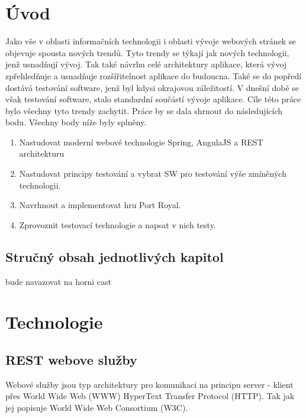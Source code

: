 \documentclass[czech,master,public,dept460,male,cpdeclaration,twoside]{diploma}
\begin{document}
\MakeTitlePages

\lstlistoflistings

\section{Úvod}
Jako vše v oblasti informačních technologii i oblasti vývoje webových stránek se objevuje spousta nových trendů. Tyto trendy se týkají jak nových technologii, jenž usnadňují vývoj. Tak také návrhu celé architektury aplikace, která vývoj zpřehledňuje a usnadňuje rozšířitelnost aplikace do budoucna. Také se do popředí dostává testování software, jenž byl kdysi okrajovou záležitostí. V dnešní době se však testování software, stalo standardní součástí vývoje aplikace. Cíle této práce bylo všechny tyto trendy zachytit. Práce by se dala shrnout do následujících bodu. Všechny body níže byly splněny.

\begin{enumerate}
	\item Nastudovat moderní webové technologie Spring, AngulaJS a REST architekturu
	\item Nastudovat principy testování a vybrat SW pro testování výše zmíněných technologii.
	\item Navrhnout a implementovat hru Port Royal.
	\item Zprovoznit testovací technologie a napsat v nich testy.
\end{enumerate}

\subsection{Stručný obsah jednotlivých kapitol}
bude navazovat na horni cast

\section{Technologie}

\subsection{REST webove služby}
Webové služby jsou typ architektury pro komunikaci na principu server - klient přes World Wide Web (WWW) HyperText Transfer Protocol (HTTP). Tak jak jej popisuje World Wide Web Consortium (W3C). \cite{WebServices}
\end{document}

